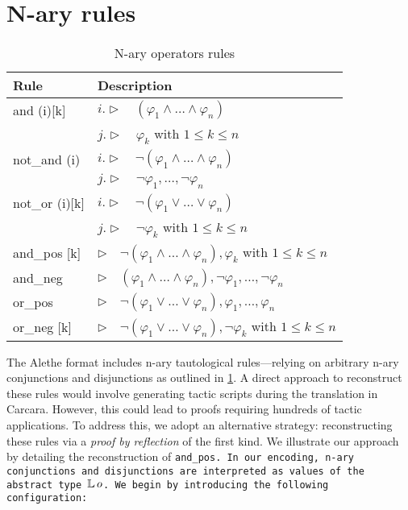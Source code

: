 \section{N-ary rules}

\begin{table}
\centering
\caption{N-ary operators rules}
\begin{tabular}{ll}
Rule & Description \\ \hline
and (i)[k] & $i. \triangleright \quad (\varphi_1 \land \dots \land \varphi_n)$ \\
    & $j. \triangleright \quad \varphi_k $ with $1 \leq k \leq n$\\
not\_and (i) & $i. \triangleright \quad \neg (\varphi_1 \land \dots \land \varphi_n)$ \\
    & $j. \triangleright \quad \neg \varphi_1, \dots, \neg \varphi_n $\\
not\_or (i)[k] & $i. \triangleright \quad \neg (\varphi_1 \lor \dots \lor \varphi_n)$\\
    & $j. \triangleright \quad \neg \varphi_k$ with $1 \leq k \leq n$\\
and\_pos [k] & $\triangleright \quad \neg (\varphi_1 \land \dots \land \varphi_n), \varphi_k$ with $1 \leq k \leq n$ \\
and\_neg & $\triangleright \quad (\varphi_1 \land \dots \land \varphi_n), \neg \varphi_1, \dots, \neg \varphi_n$ \\
or\_pos & $\triangleright \quad \neg (\varphi_1 \lor \dots \lor \varphi_n), \varphi_1, \dots, \varphi_n$ \\
or\_neg [k] & $\triangleright \quad \neg (\varphi_1 \lor \dots \lor \varphi_n), \neg \varphi_k$ with $1 \leq k \leq n$ \\
\end{tabular}
\label{table:nary-rules}
\end{table}

The Alethe format includes n-ary tautological rules—relying on arbitrary n-ary conjunctions and disjunctions as outlined in \cref{table:nary-rules}.
A direct approach to reconstruct these rules would involve generating tactic scripts during the translation in Carcara.
However, this could lead to proofs requiring hundreds of tactic applications.
To address this, we adopt an alternative strategy: reconstructing these rules via a \emph{proof by reflection} of the first kind.
We illustrate our approach by detailing the reconstruction of \tt{and\_pos}.
In our encoding, n-ary conjunctions and disjunctions are interpreted as values of the abstract type $\mathbb{L}\,o$.
We begin by introducing the following configuration:

